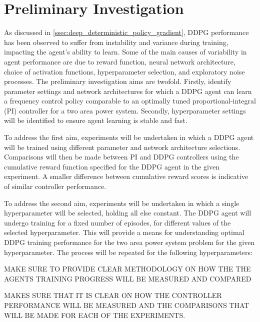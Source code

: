 \section{Preliminary Investigation}\label{sec:preliminary_investigation}
As discussed in \textsection \ref{ssec:deep_deterministic_policy_gradient}, DDPG performance has been observed to suffer from instability and variance during training, impacting the agent's ability to learn. Some of the main causes of variability in agent performance are due to reward function, neural network architecture, choice of activation functions, hyperparameter selection, and exploratory noise processes. The preliminary investigation aims are twofold. Firstly, identify parameter settings and network architectures for which a DDPG agent can learn a frequency control policy comparable to an optimally tuned proportional-integral (PI) controller for a two area power system. Secondly, hyperparameter settings will be identified to ensure agent learning is stable and fast.

To address the first aim, experiments will be undertaken in which a DDPG agent will be trained using different parameter and network architecture selections. Comparisons will then be made between PI and DDPG controllers using the cumulative reward function specified for the DDPG agent in the given experiment. A smaller difference between cumulative reward scores is indicative of similar controller performance.

To address the second aim, experiments will be undertaken in which a single hyperparameter will be selected, holding all else constant. The DDPG agent will undergo training for a fixed number of episodes, for different values of the selected hyperparameter. This will provide a means for understanding optimal DDPG training performance for the two area power system problem for the given hyperparameter. The process will be repeated for the following hyperparameters: 

MAKE SURE TO PROVIDE CLEAR METHODOLOGY ON HOW THE THE AGENTS TRAINING PROGRESS WILL BE MEASURED AND COMPARED

MAKES SURE THAT IT IS CLEAR ON HOW THE CONTROLLER PERFORMANCE WILL BE MEASURED AND THE COMPARISONS THAT WILL BE MADE FOR EACH OF THE EXPERIMENTS.

